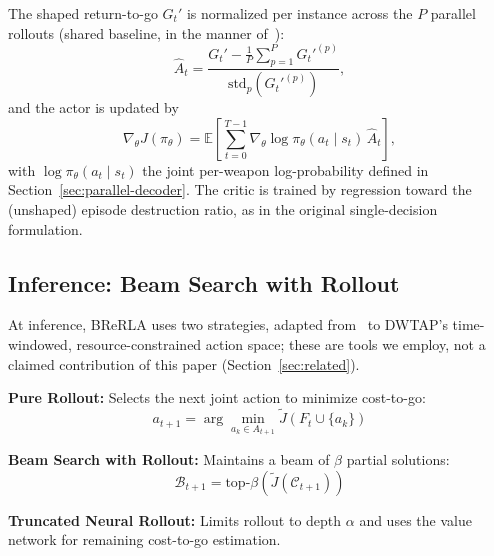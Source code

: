 \documentclass{ieeeaccess}
\begin{document}
The shaped return-to-go $G_t'$ is normalized per instance across the $P$ parallel rollouts (shared baseline, in the manner of~\cite{kwon2020pomo}):
\begin{equation}
\hat{A}_t = \frac{G_t' - \frac{1}{P}\sum_{p=1}^P G_t'^{(p)}}{\text{std}_p\!\left(G_t'^{(p)}\right)},
\end{equation}
and the actor is updated by
\begin{equation}
\nabla_\theta J(\pi_\theta) = \mathbb{E}\!\left[\sum_{t=0}^{T-1} \nabla_\theta \log \pi_\theta(a_t \mid s_t)\, \hat{A}_t\right],
\end{equation}
with $\log \pi_\theta(a_t\mid s_t)$ the joint per-weapon log-probability defined in Section~\ref{sec:parallel-decoder}. The critic is trained by regression toward the (unshaped) episode destruction ratio, as in the original single-decision formulation.

\subsection{Inference: Beam Search with Rollout}

At inference, BReRLA uses two strategies, adapted from~\cite{bertsekas1997rollout,choo2022sgbs} to DWTAP's time-windowed, resource-constrained action space; these are tools we employ, not a claimed contribution of this paper (Section~\ref{sec:related}).

\textbf{Pure Rollout:} Selects the next joint action to minimize cost-to-go:
\begin{equation}
    a_{t+1} = \arg\min_{a_k \in A_{t+1}} \widetilde{J}(F_t \cup \{a_k\})
\end{equation}

\textbf{Beam Search with Rollout:} Maintains a beam of $\beta$ partial solutions:
\begin{equation}
    \mathcal{B}_{t+1} = \text{top-}\beta(\widetilde{J}(\mathcal{C}_{t+1}))
\end{equation}

\textbf{Truncated Neural Rollout:} Limits rollout to depth $\alpha$ and uses the value network for remaining cost-to-go estimation.

\end{document}
